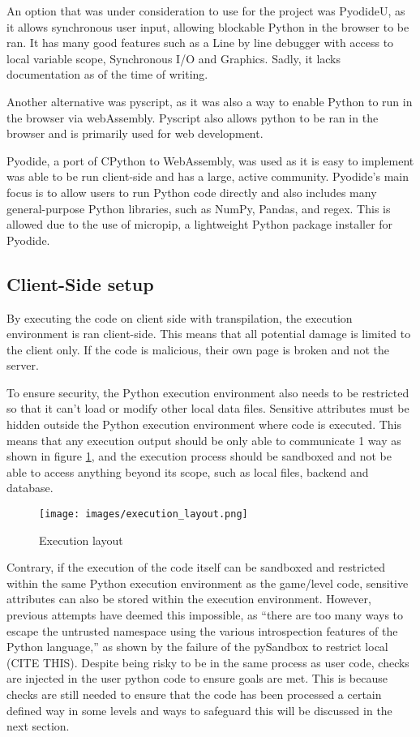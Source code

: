 An option that was under consideration to use for the project was PyodideU, as it allows synchronous user input, allowing blockable Python in the browser to be ran. It has many good features such as a Line by line debugger with access to local variable scope, Synchronous I/O and Graphics. Sadly, it lacks documentation as of the time of writing.

Another alternative was pyscript, as it was also a way to enable Python to run in the browser via webAssembly. Pyscript also allows python to be ran in the browser and is primarily used for web development.

Pyodide, a port of CPython to WebAssembly, was used as it is easy to implement was able to be run client-side and has a large, active community. Pyodide's main focus is to allow users to run Python code directly and also includes many general-purpose Python libraries, such as NumPy, Pandas, and regex. This is allowed due to the use of micropip, a lightweight Python package installer for Pyodide.

\subsection{Client-Side setup}
By executing the code on client side with transpilation, the execution environment is ran client-side. This means that all potential damage is limited to the client only. If the code is malicious, their own page is broken and not the server.

To ensure security, the Python execution environment also needs to be restricted so that it can't load or modify other local data files. Sensitive attributes must be hidden outside the Python execution environment where code is executed. This means that any execution output should be only able to communicate 1 way as shown in figure \ref{fig:execution layout}, and the execution process should be sandboxed and not be able to access anything beyond its scope, such as local files, backend and database. 

\begin{figure}[H]
    \centering
    \texttt{[image: images/execution\_layout.png]}
    \caption{Execution layout}
    \label{fig:execution layout}
\end{figure}

Contrary, if the execution of the code itself can be sandboxed and restricted within the same Python execution environment as the game/level code, sensitive attributes can also be stored within the execution environment. However, previous attempts have deemed this impossible, as “there are too many ways to escape the untrusted namespace using the various introspection features of the Python language,” as shown by the failure of the pySandbox to restrict local (CITE THIS). Despite being risky to be in the same process as user code, checks are injected in the user python code to ensure goals are met. This is because checks are still needed to ensure that the code has been processed a certain defined way in some levels and ways to safeguard this will be discussed in the next section.


